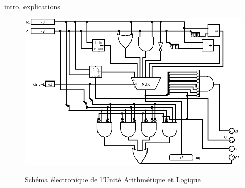 \paragraph{}{
	intro, explications
}

\begin{figure}
	\includegraphics[scale=0.5]{circuits/UAL.png}
	\label{ual_circ}
	\caption{Sch\'{e}ma \'{e}lectronique de l'Unit\'{e} Arithm\'{e}tique et Logique}
\end{figure}